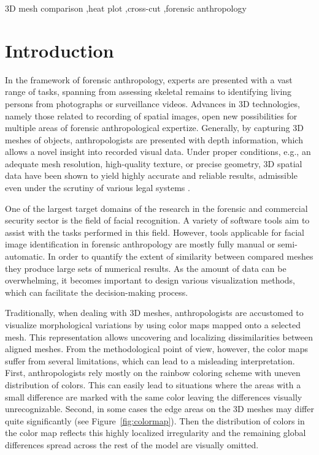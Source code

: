 \documentclass[final,5p,times]{elsarticle}
\begin{document}
\begin{frontmatter}
\begin{keyword}
3D mesh comparison \sep heat plot \sep cross-cut \sep forensic anthropology

\end{keyword}

\end{frontmatter}

\linenumbers



\section{Introduction}
In the framework of forensic anthropology, experts are presented with a vast range of tasks, spanning from assessing skeletal remains to identifying living persons from photographs or surveillance videos. 
Advances in 3D technologies, namely those related to recording of spatial images, open new possibilities for multiple areas of forensic anthropological expertize.
Generally, by capturing 3D meshes of objects, anthropologists are presented with depth information, which allows a novel insight into recorded visual data. 
Under proper conditions, e.g., an adequate mesh resolution, high-quality texture, or precise geometry, 3D spatial data have been shown to yield highly accurate and reliable results, admissible even under the scrutiny of various legal systems \cite{urbanova2015testing}.

One of the largest target domains of the research in the forensic and commercial security sector is the field of facial recognition. 
A variety of software tools aim to assist with the tasks performed in this field.
However, tools applicable for facial image identification in forensic anthropology are mostly fully manual or semi-automatic.
In order to quantify the extent of similarity between compared meshes they produce large sets of numerical results. 
As the amount of data can be overwhelming, it becomes important to design various visualization methods, which can facilitate the decision-making process.

Traditionally, when dealing with 3D meshes, anthropologists are accustomed to visualize morphological variations by using color maps mapped onto a selected mesh.
This representation allows uncovering and localizing dissimilarities between aligned meshes. 
From the methodological point of view, however, the color maps suffer from several limitations, which can lead to a misleading interpretation.
First, anthropologists rely mostly on the rainbow coloring scheme with uneven distribution of colors. 
This can easily lead to situations where the areas with a small difference are marked with the same color leaving the differences visually unrecognizable.
Second, in some cases the edge areas on the 3D meshes may differ quite significantly (see Figure~\ref{fig:colormap}).
Then the distribution of colors in the color map reflects this highly localized irregularity and the remaining global differences spread across the rest of the model are visually omitted.
\end{document}
